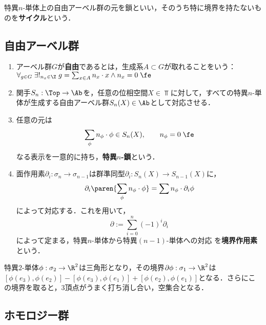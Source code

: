 \documentclass[uplatex, dvipdfmx]{jsreport}
\begin{document}
\begin{tcolorbox}[colframe=ForestGreen, colback=ForestGreen!10!white,breakable,colbacktitle=ForestGreen!40!white,coltitle=black,fonttitle=\bfseries\sffamily,
title=]
    特異$n$-単体上の自由アーベル群の元を鎖といい，そのうち特に境界を持たないものを\textbf{サイクル}という．
\end{tcolorbox}

\subsection{自由アーベル群}

\begin{definition}\mbox{}
    \begin{enumerate}
        \item アーベル群$G$が\textbf{自由}であるとは，生成系$A\subset G$が取れることをいう：$\forall_{g\in G}\;\exists!_{n_x\in\Z}\;g=\sum_{x\in A}n_x\cdot x\land n_x=0\;\fe$
        \item 関手$S_n:\Top\to\Ab$を，任意の位相空間$X\in\Top$に対して，すべての特異$n$-単体が生成する自由アーベル群$S_n(X)\in\Ab$として対応させる．
        \item 任意の元は
        \[\sum_{\phi}n_\phi\cdot\phi\in S_n(X),\qquad n_\phi=0\;\fe\]
        なる表示を一意的に持ち，\textbf{特異$n$-鎖}という．
        \item 面作用素$\partial_i:\sigma_n\to\sigma_{n-1}$は群準同型$\partial_i:S_n(X)\to S_{n-1}(X)$に，
        \[\partial_i\paren{\sum_\phi n_\phi\cdot\phi}=\sum n_\phi\cdot\partial_i\phi\]
        によって対応する．これを用いて，
        \[\partial:=\sum^n_{i=0}(-1)^i\partial_i\]
        によって定まる，特異$n$-単体から特異$(n-1)$-単体への対応
        を\textbf{境界作用素}という．
    \end{enumerate}
\end{definition}

\begin{example}[特異$2$-単体]
    特異$2$-単体$\phi:\sigma_2\to\R^2$は三角形となり，その境界$\partial\phi:\sigma_1\to\R^2$は
    $[\phi(e_3),\phi(e_2)]-[\phi(e_3),\phi(e_1)]+[\phi(e_2),\phi(e_1)]$となる．さらにこの境界を取ると，3頂点がうまく打ち消し合い，空集合となる．
\end{example}

\subsection{ホモロジー群}
\end{document}
